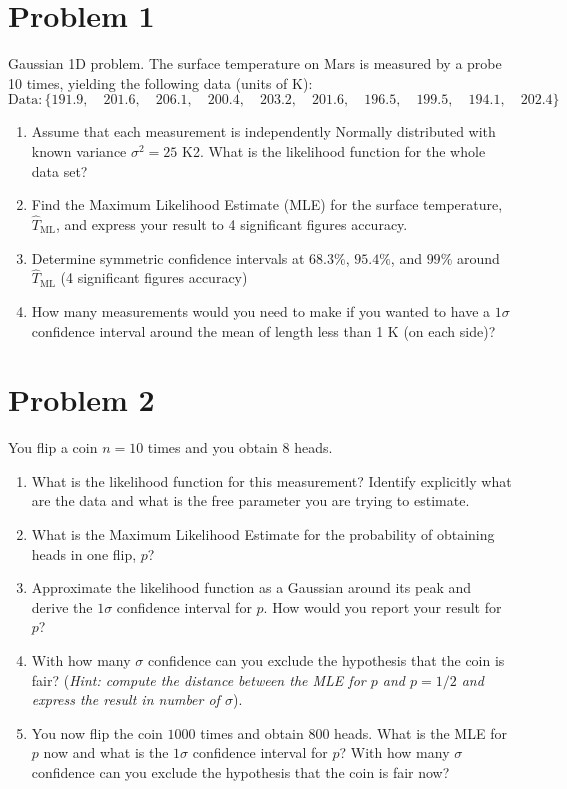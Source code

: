 \documentclass[11pt]{article}
\begin{document}
\vspace{0.5cm}
\section*{Problem 1}
Gaussian 1D problem. The surface temperature on Mars is measured by a probe 10 times, yielding the following data (units of K):
\begin{equation}
    \text{Data}: \{191.9,\quad 201.6,\quad 206.1,\quad 200.4,\quad 203.2,\quad 201.6,\quad 196.5,\quad 199.5,\quad 194.1,\quad 202.4\}
\end{equation}
\begin{enumerate}
    \item Assume that each measurement is independently Normally distributed with known variance $\sigma^2 = 25$ K2. What is the likelihood function for the whole data set?
    
    \item Find the Maximum Likelihood Estimate (MLE) for the surface temperature, $\hat{T}_{\text{ML}}$, and express your result to 4 significant figures accuracy.
    
    \item Determine symmetric confidence intervals at $68.3\%$, $95.4\%$, and $99\%$ around $\hat{T}_{\text{ML}}$ (4 significant figures accuracy)
    \item How many measurements would you need to make if you wanted to have a $1\sigma$ confidence interval around the mean of length less than 1 K (on each side)?
\end{enumerate}

\section*{Problem 2}
You flip a coin $n = 10$ times and you obtain $8$ heads.

\begin{enumerate}
    \item What is the likelihood function for this measurement? Identify explicitly what are the data and what is the free parameter you are trying to estimate.
    
    \item What is the Maximum Likelihood Estimate for the probability of obtaining heads in one flip, $p$?
    
    \item Approximate the likelihood function as a Gaussian around its peak and derive the $1\sigma$ confidence interval for $p$. How would you report your result for $p$?
    
    \item With how many $\sigma$ confidence can you exclude the hypothesis that the coin is fair? (\emph{Hint: compute the distance between the MLE for $p$ and $p = 1/2$ and
express the result in number of $\sigma$}).

    \item You now flip the coin $1000$ times and obtain $800$ heads. What is the MLE for $p$ now and what is the $1\sigma$ confidence interval for $p$? With how many $\sigma$ confidence can you exclude the hypothesis that the coin is fair now?
\end{enumerate}
\end{document}
